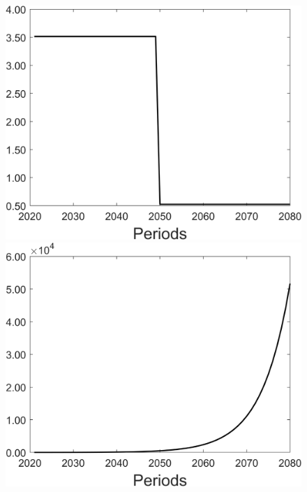 \begin{figure}[h!!]
\begin{minipage}[]{0.32\textwidth}
	\end{minipage}
	\begin{minipage}[]{0.32\textwidth}
		\includegraphics[width=1\textwidth]{../../codding_model/Own/figures/Rep_agent/staticonlyRam_separate_yd_periods59_eppsilon4.00_zeta1.40_Ad08_Ac04_thetac0.70_thetad0.56_HetGrowth1_tauul0.181_util0_withtarget1_lgd0.png}
	\end{minipage}
	\begin{minipage}[]{0.32\textwidth}
		\includegraphics[width=1\textwidth]{../../codding_model/Own/figures/Rep_agent/staticonlyRam_separate_ydyc_periods59_eppsilon4.00_zeta1.40_Ad08_Ac04_thetac0.70_thetad0.56_HetGrowth1_tauul0.181_util0_withtarget1_lgd0.png}
	\end{minipage}
\end{figure}

